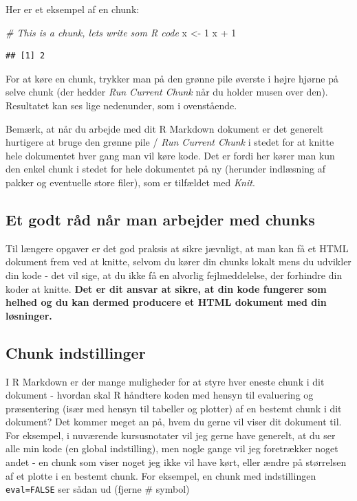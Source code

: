 \documentclass[
]{book}
\newenvironment{Shaded}{\begin{snugshade}}{\end{snugshade}}
\newcommand{\CommentTok}[1]{\textcolor[rgb]{0.56,0.35,0.01}{\textit{#1}}}
\newcommand{\DecValTok}[1]{\textcolor[rgb]{0.00,0.00,0.81}{#1}}
\newcommand{\NormalTok}[1]{#1}
\newcommand{\OtherTok}[1]{\textcolor[rgb]{0.56,0.35,0.01}{#1}}
\newcommand{\SpecialCharTok}[1]{\textcolor[rgb]{0.00,0.00,0.00}{#1}}
\begin{document}
Her er et eksempel af en chunk:

\begin{Shaded}
\begin{Highlighting}[]
\CommentTok{\# This is a chunk, let\textquotesingle{}s write som R code}
\NormalTok{x }\OtherTok{\textless{}{-}} \DecValTok{1}
\NormalTok{x }\SpecialCharTok{+} \DecValTok{1}
\end{Highlighting}
\end{Shaded}

\begin{verbatim}
## [1] 2
\end{verbatim}

For at køre en chunk, trykker man på den grønne pile øverste i højre hjørne på selve chunk (der hedder \emph{Run Current Chunk} når du holder musen over den). Resultatet kan ses lige nedenunder, som i ovenstående.

Bemærk, at når du arbejde med dit R Markdown dokument er det generelt hurtigere at bruge den grønne pile / \emph{Run Current Chunk} i stedet for at knitte hele dokumentet hver gang man vil køre kode. Det er fordi her kører man kun den enkel chunk i stedet for hele dokumentet på ny (herunder indlæsning af pakker og eventuelle store filer), som er tilfældet med \emph{Knit}.

\hypertarget{et-godt-ruxe5d-nuxe5r-man-arbejder-med-chunks}{%
\subsection{Et godt råd når man arbejder med chunks}\label{et-godt-ruxe5d-nuxe5r-man-arbejder-med-chunks}}

Til længere opgaver er det god praksis at sikre jævnligt, at man kan få et HTML dokument frem ved at knitte, selvom du kører din chunks lokalt mens du udvikler din kode - det vil sige, at du ikke få en alvorlig fejlmeddelelse, der forhindre din koder at knitte. \textbf{Det er dit ansvar at sikre, at din kode fungerer som helhed og du kan dermed producere et HTML dokument med din løsninger.}

\hypertarget{chunk-indstillinger}{%
\subsection{Chunk indstillinger}\label{chunk-indstillinger}}

I R Markdown er der mange muligheder for at styre hver eneste chunk i dit dokument - hvordan skal R håndtere koden med hensyn til evaluering og præsentering (især med hensyn til tabeller og plotter) af en bestemt chunk i dit dokument? Det kommer meget an på, hvem du gerne vil viser dit dokument til. For eksempel, i nuværende kursusnotater vil jeg gerne have generelt, at du ser alle min kode (en global indstilling), men nogle gange vil jeg foretrækker noget andet - en chunk som viser noget jeg ikke vil have kørt, eller ændre på størrelsen af et plotte i en bestemt chunk. For eksempel, en chunk med indstillingen \texttt{eval=FALSE} ser sådan ud (fjerne \# symbol)
\end{document}
